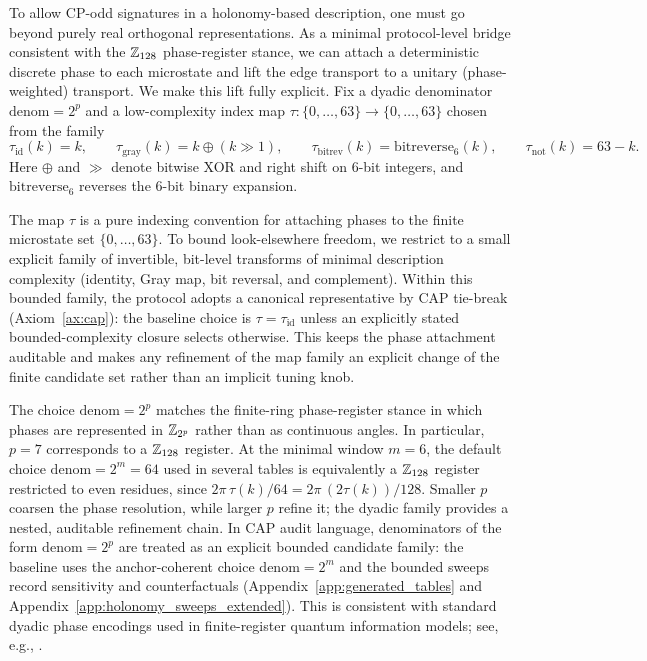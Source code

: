 To allow CP-odd signatures in a holonomy-based description, one must go beyond purely real orthogonal representations.
As a minimal protocol-level bridge consistent with the $\mathbb{Z}_{128}$ phase-register stance, we can attach a deterministic discrete phase to each microstate and lift the edge transport to a unitary (phase-weighted) transport.
We make this lift fully explicit.
Fix a dyadic denominator $\mathrm{denom}=2^p$ and a low-complexity index map $\tau:\{0,\dots,63\}\to\{0,\dots,63\}$ chosen from the family
\[
\tau_{\mathrm{id}}(k)=k,\qquad
\tau_{\mathrm{gray}}(k)=k\oplus (k\!\gg\!1),\qquad
\tau_{\mathrm{bitrev}}(k)=\mathrm{bitreverse}_6(k),\qquad
\tau_{\mathrm{not}}(k)=63-k.
\]
Here $\oplus$ and $\gg$ denote bitwise XOR and right shift on $6$-bit integers, and $\mathrm{bitreverse}_6$ reverses the $6$-bit binary expansion.
\begin{remark}\label{rem:tau_family_bounded}
The map $\tau$ is a pure indexing convention for attaching phases to the finite microstate set $\{0,\dots,63\}$.
To bound look-elsewhere freedom, we restrict to a small explicit family of invertible, bit-level transforms of minimal description complexity (identity, Gray map, bit reversal, and complement).
Within this bounded family, the protocol adopts a canonical representative by CAP tie-break (Axiom~\ref{ax:cap}): the baseline choice is $\tau=\tau_{\mathrm{id}}$ unless an explicitly stated bounded-complexity closure selects otherwise.
This keeps the phase attachment auditable and makes any refinement of the map family an explicit change of the finite candidate set rather than an implicit tuning knob.
\end{remark}
\begin{remark}\label{rem:dyadic_phase_register}
The choice $\mathrm{denom}=2^p$ matches the finite-ring phase-register stance in which phases are represented in $\mathbb{Z}_{2^p}$ rather than as continuous angles.
In particular, $p=7$ corresponds to a $\mathbb{Z}_{128}$ register.
At the minimal window $m=6$, the default choice $\mathrm{denom}=2^m=64$ used in several tables is equivalently a $\mathbb{Z}_{128}$ register restricted to even residues, since $2\pi\,\tau(k)/64=2\pi\,(2\tau(k))/128$.
Smaller $p$ coarsen the phase resolution, while larger $p$ refine it; the dyadic family provides a nested, auditable refinement chain.
In CAP audit language, denominators of the form $\mathrm{denom}=2^p$ are treated as an explicit bounded candidate family: the baseline uses the anchor-coherent choice $\mathrm{denom}=2^m$ and the bounded sweeps record sensitivity and counterfactuals (Appendix~\ref{app:generated_tables} and Appendix~\ref{app:holonomy_sweeps_extended}).
This is consistent with standard dyadic phase encodings used in finite-register quantum information models; see, e.g., \cite{NielsenChuang2010}.
\end{remark}

